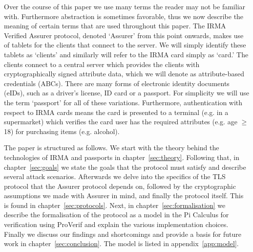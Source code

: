 Over the course of this paper we use many terms the reader may not be familiar with. Furthermore abstraction is sometimes favorable, thus we now describe the meaning of certain terms that are used throughout this paper. The IRMA Verified Assurer protocol, denoted `Assurer' from this point onwards, makes use of tablets for the clients that connect to the server. We will simply identify these tablets as `clients' and similarly will refer to the IRMA card simply as `card.' The clients connect to a central server which provides the clients with cryptographically signed attribute data, which we will denote as attribute-based credentials (ABCs). There are many forms of electronic identity documents (eIDs), such as a driver's license, ID card or a passport. For simplicity we will use the term `passport' for all of these variations. Furthermore, authentication with respect to IRMA cards means the card is presented to a terminal (e.g. in a supermarket) which verifies the card user has the required attributes (e.g. age $\geq$ 18) for purchasing items (e.g. alcohol).

The paper is structured as follows. We start with the theory behind the technologies of IRMA and passports in chapter~\ref{sec:theory}. Following that, in chapter~\ref{sec:goals} we state the goals that the protocol must satisfy and describe several attack scenarios. Afterwards we delve into the specifics of the TLS protocol that the Assurer protocol depends on, followed by the cryptographic assumptions we made with Assurer in mind, and finally the protocol itself. This is found in chapter~\ref{sec:protocols}. Next, in chapter~\ref{sec:formalisation} we describe the formalisation of the protocol as a model in the Pi Calculus for verification using ProVerif and explain the various implementation choices. Finally we discuss our findings and shortcomings and provide a basis for future work in chapter~\ref{sec:conclusion}. The model is listed in appendix~\ref{app:model}.

